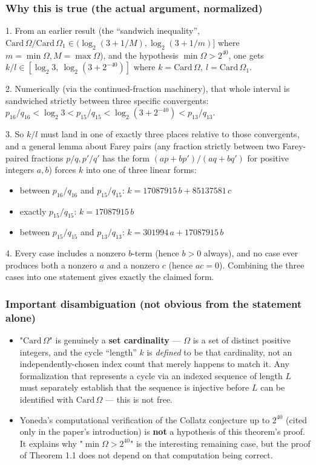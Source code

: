 \documentclass[11pt]{article}
\begin{document}
\subsubsection*{Why this is true (the actual argument, normalized)}
1. From an earlier result (the ``sandwich inequality'', $\mathrm{Card}\,\Omega / \mathrm{Card}\,\Omega_1 \in (\log_2(3+1/M), \log_2(3+1/m)]$ where $m=\min\Omega, M=\max\Omega$), and the hypothesis $\min\Omega > 2^{40}$, one gets $k/l \in [\log_2 3,\ \log_2(3+2^{-40})]$ where $k=\mathrm{Card}\,\Omega,\ l=\mathrm{Card}\,\Omega_1$.

2. Numerically (via the continued-fraction machinery), that whole interval is sandwiched strictly between three specific convergents: $p_{16}/q_{16} < \log_2 3 < p_{15}/q_{15} < \log_2(3+2^{-40}) < p_{13}/q_{13}$.

3. So $k/l$ must land in one of exactly three places relative to those convergents, and a general lemma about Farey pairs (any fraction strictly between two Farey-paired fractions $p/q, p'/q'$ has the form $(ap+bp')/(aq+bq')$ for positive integers $a,b$) forces $k$ into one of three linear forms:

\begin{itemize}
\item between $p_{16}/q_{16}$ and $p_{15}/q_{15}$: $k = 17087915\,b + 85137581\,c$
\item exactly $p_{15}/q_{15}$: $k = 17087915\,b$
\item between $p_{15}/q_{15}$ and $p_{13}/q_{13}$: $k = 301994\,a + 17087915\,b$
\end{itemize}
4. Every case includes a nonzero $b$-term (hence $b>0$ always), and no case ever produces both a nonzero $a$ and a nonzero $c$ (hence $ac=0$). Combining the three cases into one statement gives exactly the claimed form.

\subsubsection*{Important disambiguation (not obvious from the statement alone)}
\begin{itemize}
\item "$\mathrm{Card}\,\Omega$" is genuinely a \textbf{set cardinality} --- $\Omega$ is a set of distinct positive integers, and the cycle ``length'' $k$ is \emph{defined} to be that cardinality, not an independently-chosen index count that merely happens to match it. Any formalization that represents a cycle via an indexed sequence of length $L$ must separately establish that the sequence is injective before $L$ can be identified with $\mathrm{Card}\,\Omega$ --- this is not free.
\item Yoneda's computational verification of the Collatz conjecture up to $2^{40}$ (cited only in the paper's introduction) is \textbf{not} a hypothesis of this theorem's proof. It explains why "$\min\Omega > 2^{40}$" is the interesting remaining case, but the proof of Theorem 1.1 does not depend on that computation being correct.
\end{itemize}
\end{document}
